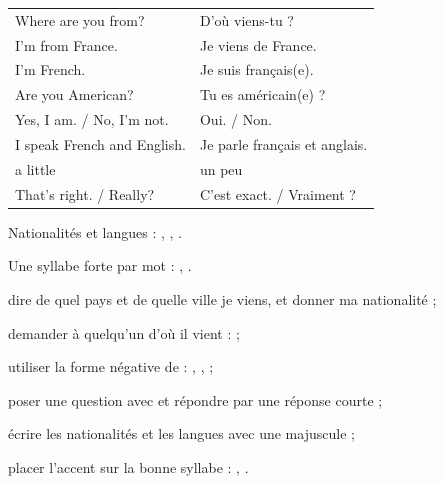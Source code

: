 
\begin{essentiel}
\begin{minipage}[t]{0.56\linewidth}
\renewcommand{\arraystretch}{1.32}
\begin{tabular}{@{}>{\enOn\otSemi\fontsize{9.4}{11}\selectfont}l<{\enOff}@{\hspace{3mm}}>{\fontsize{9.2}{11}\selectfont\color{white!78!otNavy}}l@{}}
Where are you from?            & D'où viens-tu ?\\
I'm from France.               & Je viens de France.\\
I'm French.                    & Je suis français(e).\\
Are you American?              & Tu es américain(e) ?\\
Yes, I am. / No, I'm not.      & Oui. / Non.\\
I speak French and English.    & Je parle français et anglais.\\
a little                       & un peu\\
That's right. / Really?        & C'est exact. / Vraiment ?\\
\end{tabular}
\end{minipage}\hfill
\begin{minipage}[t]{0.38\linewidth}
{}
{}
{\fontsize{9.2}{11.6}\selectfont Nationalités et langues : , , .\par}
{\fontsize{9.2}{11.6}\selectfont Une syllabe forte par mot : , .\par}
\end{minipage}
\end{essentiel}

\begin{jesais}
\item dire de quel pays et de quelle ville je viens, et donner ma nationalité ;
\item demander à quelqu'un d'où il vient :  ;
\item utiliser la forme négative de  : , ,  ;
\item poser une question avec  et répondre par une réponse courte ;
\item écrire les nationalités et les langues avec une majuscule ;
\item placer l'accent sur la bonne syllabe : , .
\end{jesais}

